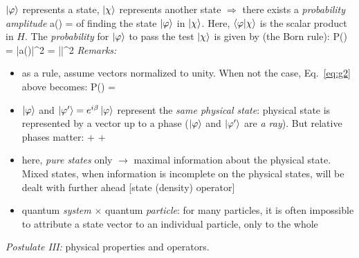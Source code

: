 \documentclass[12pt]{article}
\begin{document}
$\ket{\varphi}$ represents a state,
$\ket{\chi}$ represents another state $\Rightarrow$
there exists a \emph{probability amplitude}
\be
a(\varphi \to \chi) = \bra{\chi}\ket{\varphi}
\ee
of finding the state $\ket{\varphi}$ in $\ket{\chi}$. Here,
$\bra{\varphi}\ket{\chi}$ is the scalar product in $H$.
The \emph{probability} for $\ket{\varphi}$ to pass the test $\ket{\chi}$ is given by (the Born rule):
\setcounter{equation}{1}
\be
P(\varphi \to \chi) = |a(\varphi \to \chi)|^2 = |\bra{\chi}\ket{\varphi}|^2
\label{eq:g2}
\ee
\emph{Remarks:}
\begin{itemize}
\item as a rule, assume vectors normalized to unity.
When not the case, Eq.~\eqref{eq:g2} above becomes:
\be
P(\varphi \to \chi) = 
\ee
%
\item $\ket{\varphi}$ and $\ket{\varphi^\prime} = e^{i\beta}\ket{\varphi}$ represent the \emph{same 
physical state}: physical state is represented by 
a vector up to a phase ($\ket{\varphi}$ and $\ket{\varphi^\prime}$ are \emph{a ray}).
But relative phases matter:
\be
\lambda\ket{\varphi}+\mu\ket{\chi}
\lambda\ket{\varphi^\prime}+\mu\ket{\chi}
\ee
%
\item here, \emph{pure states} only $\to$ maximal information
about the physical state.
Mixed states, when information is incomplete
on the physical states, will be dealt with
further ahead [state (density) operator]
%
\item quantum \emph{system} $\times$ quantum \emph{particle}: for many
particles, it is often impossible to attribute a
state vector to an individual particle, only to
the whole
\end{itemize}

\emph{Postulate III:} physical properties and operators.
\end{document}
